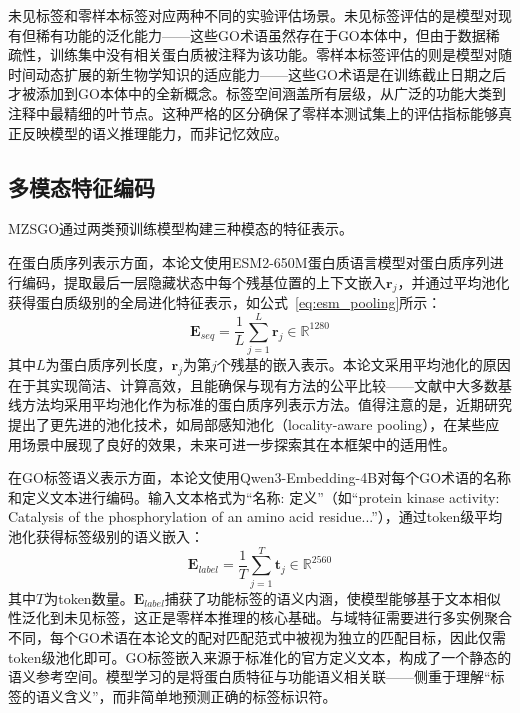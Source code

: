 未见标签和零样本标签对应两种不同的实验评估场景。未见标签评估的是模型对现有但稀有功能的泛化能力——这些GO术语虽然存在于GO本体中，但由于数据稀疏性，训练集中没有相关蛋白质被注释为该功能。零样本标签评估的则是模型对随时间动态扩展的新生物学知识的适应能力——这些GO术语是在训练截止日期之后才被添加到GO本体中的全新概念。标签空间涵盖所有层级，从广泛的功能大类到注释中最精细的叶节点。这种严格的区分确保了零样本测试集上的评估指标能够真正反映模型的语义推理能力，而非记忆效应。

\subsection{多模态特征编码}

MZSGO通过两类预训练模型构建三种模态的特征表示。

在蛋白质序列表示方面，本论文使用ESM2-650M\cite{lin2023evolutionary}蛋白质语言模型对蛋白质序列进行编码，提取最后一层隐藏状态中每个残基位置的上下文嵌入$\mathbf{r}_j$，并通过平均池化获得蛋白质级别的全局进化特征表示，如公式~\eqref{eq:esm_pooling}所示：
\begin{equation}
\label{eq:esm_pooling}
    \mathbf{E}_{seq} = \frac{1}{L} \sum_{j=1}^{L} \mathbf{r}_j \in \mathbb{R}^{1280}
\end{equation}
其中$L$为蛋白质序列长度，$\mathbf{r}_j$为第$j$个残基的嵌入表示。本论文采用平均池化的原因在于其实现简洁、计算高效，且能确保与现有方法的公平比较——文献中大多数基线方法均采用平均池化作为标准的蛋白质序列表示方法。值得注意的是，近期研究提出了更先进的池化技术，如局部感知池化（locality-aware pooling）\cite{hoang2025locality}，在某些应用场景中展现了良好的效果，未来可进一步探索其在本框架中的适用性。

在GO标签语义表示方面，本论文使用Qwen3-Embedding-4B\cite{zhang2025qwen3}对每个GO术语的名称和定义文本进行编码。输入文本格式为“名称: 定义”（如``protein kinase activity: Catalysis of the phosphorylation of an amino acid residue...''），通过token级平均池化获得标签级别的语义嵌入：
\begin{equation}
    \mathbf{E}_{label} = \frac{1}{T} \sum_{j=1}^{T} \mathbf{t}_j \in \mathbb{R}^{2560}
\end{equation}
其中$T$为token数量。$\mathbf{E}_{label}$捕获了功能标签的语义内涵，使模型能够基于文本相似性泛化到未见标签，这正是零样本推理的核心基础。与域特征需要进行多实例聚合不同，每个GO术语在本论文的配对匹配范式中被视为独立的匹配目标，因此仅需token级池化即可。GO标签嵌入来源于标准化的官方定义文本，构成了一个静态的语义参考空间。模型学习的是将蛋白质特征与功能语义相关联——侧重于理解“标签的语义含义”，而非简单地预测正确的标签标识符。

